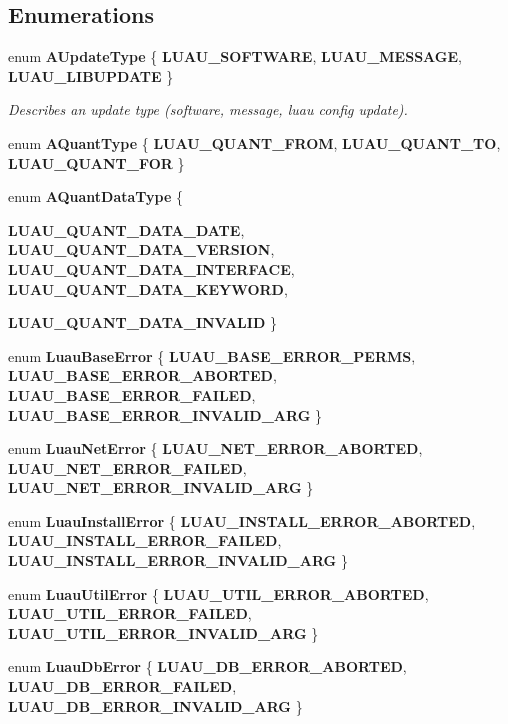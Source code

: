 \subsection*{Enumerations}
\begin{CompactItemize}
\item 
enum {\bf AUpdate\-Type} \{ {\bf LUAU\_\-SOFTWARE}, 
{\bf LUAU\_\-MESSAGE}, 
{\bf LUAU\_\-LIBUPDATE}
 \}
\begin{CompactList}\small\item\em Describes an update type (software, message, luau config update). \item\end{CompactList}\item 
enum {\bf AQuant\-Type} \{ {\bf LUAU\_\-QUANT\_\-FROM}, 
{\bf LUAU\_\-QUANT\_\-TO}, 
{\bf LUAU\_\-QUANT\_\-FOR}
 \}
\item 
enum {\bf AQuant\-Data\-Type} \{ \par
{\bf LUAU\_\-QUANT\_\-DATA\_\-DATE}, 
{\bf LUAU\_\-QUANT\_\-DATA\_\-VERSION}, 
{\bf LUAU\_\-QUANT\_\-DATA\_\-INTERFACE}, 
{\bf LUAU\_\-QUANT\_\-DATA\_\-KEYWORD}, 
\par
{\bf LUAU\_\-QUANT\_\-DATA\_\-INVALID}
 \}
\item 
enum {\bf Luau\-Base\-Error} \{ {\bf LUAU\_\-BASE\_\-ERROR\_\-PERMS}, 
{\bf LUAU\_\-BASE\_\-ERROR\_\-ABORTED}, 
{\bf LUAU\_\-BASE\_\-ERROR\_\-FAILED}, 
{\bf LUAU\_\-BASE\_\-ERROR\_\-INVALID\_\-ARG}
 \}
\item 
enum {\bf Luau\-Net\-Error} \{ {\bf LUAU\_\-NET\_\-ERROR\_\-ABORTED}, 
{\bf LUAU\_\-NET\_\-ERROR\_\-FAILED}, 
{\bf LUAU\_\-NET\_\-ERROR\_\-INVALID\_\-ARG}
 \}
\item 
enum {\bf Luau\-Install\-Error} \{ {\bf LUAU\_\-INSTALL\_\-ERROR\_\-ABORTED}, 
{\bf LUAU\_\-INSTALL\_\-ERROR\_\-FAILED}, 
{\bf LUAU\_\-INSTALL\_\-ERROR\_\-INVALID\_\-ARG}
 \}
\item 
enum {\bf Luau\-Util\-Error} \{ {\bf LUAU\_\-UTIL\_\-ERROR\_\-ABORTED}, 
{\bf LUAU\_\-UTIL\_\-ERROR\_\-FAILED}, 
{\bf LUAU\_\-UTIL\_\-ERROR\_\-INVALID\_\-ARG}
 \}
\item 
enum {\bf Luau\-Db\-Error} \{ {\bf LUAU\_\-DB\_\-ERROR\_\-ABORTED}, 
{\bf LUAU\_\-DB\_\-ERROR\_\-FAILED}, 
{\bf LUAU\_\-DB\_\-ERROR\_\-INVALID\_\-ARG}
 \}
\end{CompactItemize}
